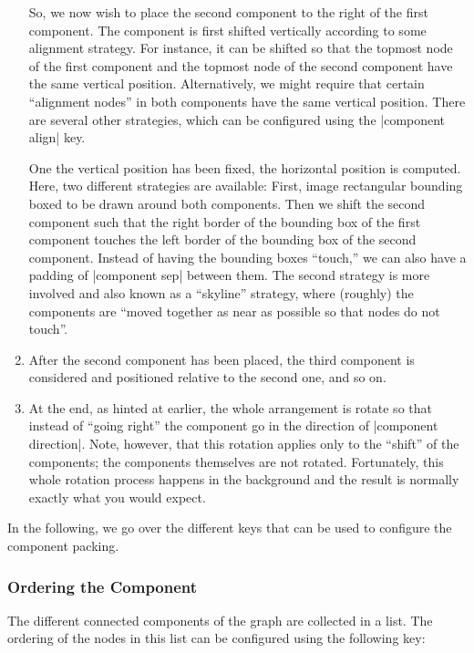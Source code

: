 \begin{enumerate}
  So, we now wish to place the second component to the right of the
  first component. The component is first shifted vertically according
  to some alignment strategy. For instance, it can be shifted so that
  the topmost node of the first component and the topmost node of the
  second component have the same vertical position. Alternatively, we
  might require that certain ``alignment nodes'' in both components
  have the same vertical position. There are several other strategies,
  which can be configured using the |component align| key.

  One the vertical position has been fixed, the horizontal position is
  computed. Here, two different strategies are available: First, image
  rectangular bounding boxed to be drawn around both components. Then
  we shift the second component such that the right border of the
  bounding box of the first component touches the left border of the
  bounding box of the second component. Instead of having the bounding
  boxes ``touch,'' we can also have a padding of |component sep|
  between them. The second strategy is more involved and also known as
  a ``skyline'' strategy, where (roughly) the components are ``moved together as
  near as possible so that nodes do not touch''. 
\item
  After the second component has been placed, the third component is
  considered and positioned relative to the second one, and so on.
\item
  At the end, as hinted at earlier, the whole arrangement is rotate so
  that instead of ``going right'' the component go in the direction of
  |component direction|. Note, however, that this rotation applies only
  to the ``shift'' of the components; the components themselves are
  not rotated. Fortunately, this whole rotation process happens in the
  background and the result is normally exactly what you would expect.
\end{enumerate}

In the following, we go over the different keys that can be used to
configure the component packing.


\subsubsection{Ordering the Component}

The different connected components of the graph are collected in a
list. The ordering of the nodes in this list can be configured using
the following key:

